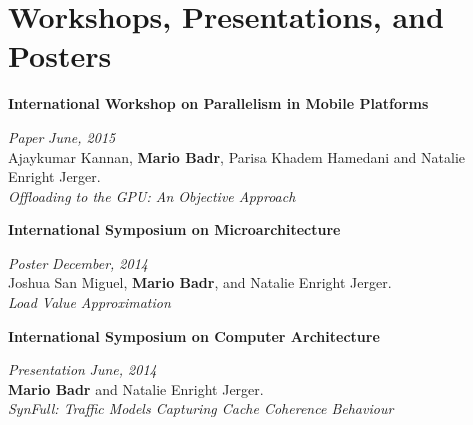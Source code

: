 \section{\sc Workshops, Presentations, and Posters}

{\bf International Workshop on Parallelism in Mobile Platforms}
\vspace{-.3cm}

{\em Paper} \hfill {\em June, 2015}\\
Ajaykumar Kannan, \textbf{Mario Badr}, Parisa Khadem Hamedani and Natalie Enright Jerger.\\
\textit{Offloading to the GPU: An Objective Approach}


{\bf International Symposium on Microarchitecture}
\vspace{-.3cm}

{\em Poster} \hfill {\em December, 2014}\\
Joshua San Miguel, \textbf{Mario Badr}, and Natalie Enright Jerger.\\
\textit{Load Value Approximation}

{\bf International Symposium on Computer Architecture}
\vspace{-.3cm}

{\em Presentation} \hfill {\em June, 2014}\\
\textbf{Mario Badr} and Natalie Enright Jerger.\\
\textit{SynFull: Traffic Models Capturing Cache Coherence Behaviour}




